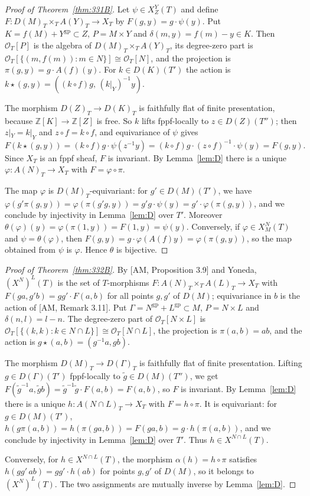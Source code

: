 \begin{proof}[Proof of Theorem~\ref{thm:331B}]
Let $\psi\in X^{Y}_{Z}(T)$ and define $F\colon D(M)_T\times_T A(Y)_T\to X_T$ by $F(g,y)=g\cdot\psi(y)$. Put $K=f(M)+Y^{\mathrm{gp}}\subset Z$, $P=M\times Y$ and $\delta(m,y)=f(m)-y\in K$. Then $\mathcal{O}_T[P]$ is the algebra of $D(M)_T\times_T A(Y)_T$, its degree-zero part is $\mathcal{O}_T[\{(m,f(m)):m\in N\}]\cong\mathcal{O}_T[N]$, and the projection is $\pi(g,y)=g\cdot A(f)(y)$. For $k\in D(K)(T')$ the action is $k\star(g,y)=((k\circ f)g,\,(k|_Y)^{-1}y)$.

The morphism $D(Z)_T\to D(K)_T$ is faithfully flat of finite presentation, because $\mathbb{Z}[K]\to\mathbb{Z}[Z]$ is free. So $k$ lifts fppf-locally to $z\in D(Z)(T'')$; then $z|_Y=k|_Y$ and $z\circ f=k\circ f$, and equivariance of $\psi$ gives
\[
F(k\star(g,y))=(k\circ f)g\cdot\psi(z^{-1}y)=(k\circ f)g\cdot(z\circ f)^{-1}\cdot\psi(y)=F(g,y).
\]
Since $X_T$ is an fppf sheaf, $F$ is invariant. By Lemma~\ref{lem:D} there is a unique $\varphi\colon A(N)_T\to X_T$ with $F=\varphi\circ\pi$.

The map $\varphi$ is $D(M)_T$-equivariant: for $g'\in D(M)(T')$, we have $\varphi(g'\pi(g,y))=\varphi(\pi(g'g,y))=g'g\cdot\psi(y)=g'\cdot\varphi(\pi(g,y))$, and we conclude by injectivity in Lemma~\ref{lem:D} over $T'$. Moreover $\theta(\varphi)(y)=\varphi(\pi(1,y))=F(1,y)=\psi(y)$. Conversely, if $\varphi\in X^{N}_{M}(T)$ and $\psi=\theta(\varphi)$, then $F(g,y)=g\cdot\varphi(A(f)y)=\varphi(\pi(g,y))$, so the map obtained from $\psi$ is $\varphi$. Hence $\theta$ is bijective.
\end{proof}

\begin{proof}[Proof of Theorem~\ref{thm:332B}]
By [AM, Proposition 3.9] and Yoneda, $(X^{N})^{L}(T)$ is the set of $T$-morphisms $F\colon A(N)_T\times_T A(L)_T\to X_T$ with $F(ga,g'b)=gg'\cdot F(a,b)$ for all points $g,g'$ of $D(M)$; equivariance in $b$ is the action of [AM, Remark 3.11]. Put $\Gamma=N^{\mathrm{gp}}+L^{\mathrm{gp}}\subset M$, $P=N\times L$ and $\delta(n,l)=l-n$. The degree-zero part of $\mathcal{O}_T[N\times L]$ is $\mathcal{O}_T[\{(k,k):k\in N\cap L\}]\cong\mathcal{O}_T[N\cap L]$, the projection is $\pi(a,b)=ab$, and the action is $g\star(a,b)=(g^{-1}a,gb)$.

The morphism $D(M)_T\to D(\Gamma)_T$ is faithfully flat of finite presentation. Lifting $g\in D(\Gamma)(T')$ fppf-locally to $\tilde{g}\in D(M)(T'')$, we get $F(\tilde{g}^{-1}a,\tilde{g}b)=\tilde{g}^{-1}\tilde{g}\cdot F(a,b)=F(a,b)$, so $F$ is invariant. By Lemma~\ref{lem:D} there is a unique $h\colon A(N\cap L)_T\to X_T$ with $F=h\circ\pi$. It is equivariant: for $g\in D(M)(T')$, $h(g\pi(a,b))=h(\pi(ga,b))=F(ga,b)=g\cdot h(\pi(a,b))$, and we conclude by injectivity in Lemma~\ref{lem:D} over $T'$. Thus $h\in X^{N\cap L}(T)$.

Conversely, for $h\in X^{N\cap L}(T)$, the morphism $\alpha(h)=h\circ\pi$ satisfies $h(gg'\,ab)=gg'\cdot h(ab)$ for points $g,g'$ of $D(M)$, so it belongs to $(X^{N})^{L}(T)$. The two assignments are mutually inverse by Lemma~\ref{lem:D}.
\end{proof}
